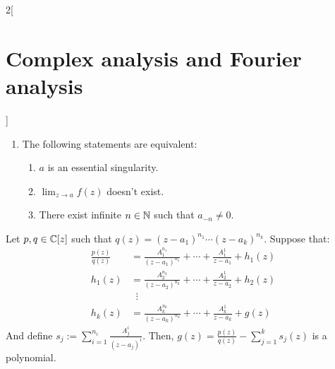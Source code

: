 \documentclass[../../../main.tex]{subfiles}
\begin{document}
\begin{multicols}{2}[\section{Complex analysis and Fourier analysis}]
\begin{corollary}
\begin{enumerate}
            \begin{enumerate}
              \item $a$ is a pole of order $m\in\NN$.
              \item $\displaystyle\lim_{z\to a} \abs{f(z){(z-a)}^k}= \infty$ $\forall k\in\{0,1,\ldots,m-1\}$.
              \item $a_n=0\ \forall n\leq -m-1$ and $a_{-m}\ne 0$.
            \end{enumerate}
      \item  The following statements are equivalent:
            \begin{enumerate}
              \item $a$ is an essential singularity.
              \item $\displaystyle\lim_{z\to a} f(z)$ doesn't exist.
              \item There exist infinite $n\in\mathbb{N}$ such that $a_{-n}\ne 0$.
            \end{enumerate}
    \end{enumerate}
  \end{corollary}
  \begin{corollary}
    Let $p,q\in\mathbb{C}[z]$ such that $q(z)={(z-a_1)}^{n_1}\cdots{(z-a_k)}^{n_k}$. Suppose that:
    \begin{align*}
      \frac{p(z)}{q(z)} & =\frac{A_1^{n_1}}{{(z-a_1)}^{n_1}}+\cdots+\frac{A_1^{1}}{z-a_1}+h_1(z) \\
      h_1(z)            & =\frac{A_2^{n_2}}{{(z-a_2)}^{n_2}}+\cdots+\frac{A_2^{1}}{z-a_2}+h_2(z) \\
                        & \;\;\vdots                                                             \\
      h_k(z)            & =\frac{A_k^{n_k}}{{(z-a_k)}^{n_k}}+\cdots+\frac{A_k^{1}}{z-a_k}+g(z)
    \end{align*}
    And define $s_j:=\sum_{i= 1}^{n_i}\frac{A_j^i}{{(z-a_j)}^i}$.
    Then, $g(z)=\frac{p(z)}{q(z)}-\sum_{j=1}^k s_j(z)$ is a polynomial.
  \end{corollary}

\end{multicols}
\end{document}
